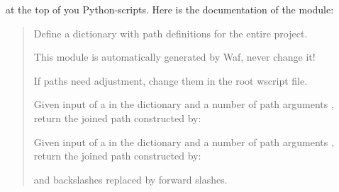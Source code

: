 \documentclass[a4paper,11pt,english]{sphinxmanual}
\begin{document}
at the top of you Python-scripts. Here is the documentation of the module:
\begin{quote}


\label{\detokenize{introduction:module-bld.project_paths}}
Define a dictionary  with path
definitions for the entire project.

This module is automatically generated by Waf, never change it!

If paths need adjustment, change them in the root wscript file.

\begin{fulllineitems}
\label{\detokenize{introduction:bld.project_paths.project_paths_join}}
Given input of a  in the  dictionary and a number
of path arguments , return the joined path constructed by:

\begin{sphinxVerbatim}[commandchars=\\\{\}]
\PYG{p}{[}\PYG{p}{]} 
\end{sphinxVerbatim}

\end{fulllineitems}


\begin{fulllineitems}
\label{\detokenize{introduction:bld.project_paths.project_paths_join_latex}}
Given input of a  in the  dictionary and a number
of path arguments , return the joined path constructed by:

\begin{sphinxVerbatim}[commandchars=\\\{\}]
\PYG{p}{[}\PYG{p}{]} 
\end{sphinxVerbatim}

and backslashes replaced by forward slashes.

\end{fulllineitems}

\end{quote}
\end{document}
